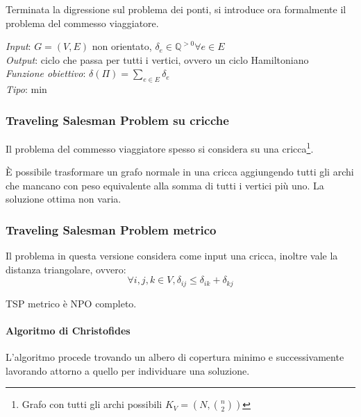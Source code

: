 Terminata la digressione sul problema dei ponti, si introduce ora formalmente 
il problema del commesso viaggiatore.

\emph{Input}: $G = (V,E)$ non orientato, $\delta_e \in \mathbb{Q}^{>0} \forall e\in E$\\
\emph{Output}: ciclo che passa per tutti i vertici, ovvero un ciclo Hamiltoniano\\
\emph{Funzione obiettivo}: $\delta(\Pi) = \sum_{e\in E}\delta_e$\\
\emph{Tipo}: min

\subsubsection{Traveling Salesman Problem su cricche}
Il problema del commesso viaggiatore spesso si considera su 
una cricca\footnote{Grafo con tutti gli archi possibili $K_V = (N, \binom{n}{2} )$}.

È possibile trasformare un grafo normale in una cricca aggiungendo 
tutti gli archi che mancano con peso equivalente alla somma di tutti i vertici più uno.
La soluzione ottima non varia.

\subsubsection{Traveling Salesman Problem metrico}
Il problema in questa versione considera come input una cricca, 
inoltre vale la distanza triangolare, ovvero: 
$$\forall i, j, k \in V, \delta_{ij} \leq \delta_{ik}+\delta_{kj}$$

\begin{theorem}
    TSP metrico è NPO completo.
\end{theorem}

\paragraph{Algoritmo di Christofides}
L'algoritmo procede trovando un albero di copertura minimo e successivamente lavorando attorno 
a quello per individuare una soluzione.

